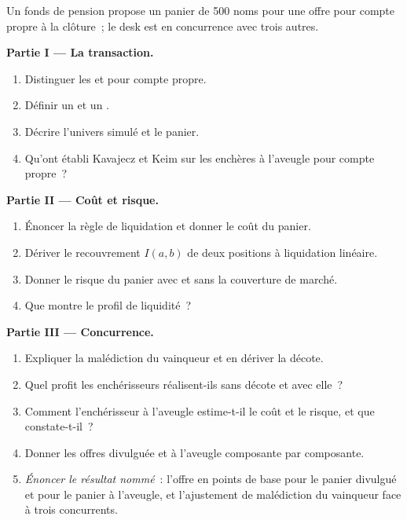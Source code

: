 \begin{problem}\label{pb:mx:portfolio-trades-and-risk-bids:1}
Un fonds de pension propose un panier de 500 noms pour une offre pour compte propre à la clôture~; le desk est en concurrence avec trois autres.

\medskip\noindent\textbf{Partie I --- La transaction.}
\begin{enumerate}
\item Distinguer les  et pour compte propre.
\item Définir un  et un .
\item Décrire l'univers simulé et le panier.
\item Qu'ont établi Kavajecz et Keim sur les enchères à l'aveugle pour compte propre~?
\end{enumerate}

\medskip\noindent\textbf{Partie II --- Coût et risque.}
\begin{enumerate}[resume]
\item Énoncer la règle de liquidation et donner le coût du panier.
\item Dériver le recouvrement $I(a,b)$ de deux positions à liquidation linéaire.
\item Donner le risque du panier avec et sans la couverture de marché.
\item Que montre le profil de liquidité~?
\end{enumerate}

\medskip\noindent\textbf{Partie III --- Concurrence.}
\begin{enumerate}[resume]
\item Expliquer la malédiction du vainqueur et en dériver la décote.
\item Quel profit les enchérisseurs réalisent-ils sans décote et avec elle~?
\item Comment l'enchérisseur à l'aveugle estime-t-il le coût et le risque, et que constate-t-il~?
\item Donner les offres divulguée et à l'aveugle composante par composante.
\item \emph{Énoncer le résultat nommé}~: l'offre en points de base pour le panier divulgué et pour le panier à l'aveugle, et l'ajustement de malédiction du vainqueur face à trois
concurrents.
\end{enumerate}


\end{problem}
